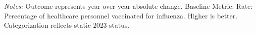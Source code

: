 \begin{table}[htbp]
    \centering
    \caption{Timeline of Change in ASC-8: Influenza Vaccination Coverage by Authority}
    \label{tab:d_asc_rate_8_timeline}
    \vspace{0.2cm}
    \vspace{0.1cm}
    \begin{minipage}{\textwidth}
        \footnotesize \textit{Notes:} Outcome represents year-over-year absolute change. Baseline Metric: Rate: Percentage of healthcare personnel vaccinated for influenza. Higher is better. Categorization reflects static 2023 status.
    \end{minipage}
\end{table}